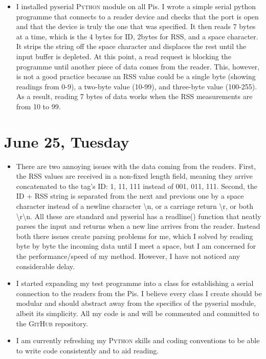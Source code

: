 \documentclass[a4paper,12pt]{article}
\begin{document}
\begin{itemize}
	\item I installed \textsf{pyserial} \textsc{Python} module on all Pis. I wrote a simple serial python programme that connects to a reader device and checks that the port is open and that the device is truly the one that was specified. It then reads 7 bytes at a time, which is the 4 bytes for ID, 2bytes for RSS, and a space character. It strips the string off the space character and displaces the rest until the input buffer is depleted. At this point, a read request is blocking the programme until another piece of data comes from the reader. This, however, is not a good practice because an RSS value could be a single byte (showing readings from 0-9), a two-byte value (10-99), and three-byte value (100-255). As a result, reading 7 bytes of data works when the RSS measurements are from 10 to 99.
\end{itemize}

\section{June 25, Tuesday}

\begin{itemize}
	\item There are two annoying issues with the data coming from the readers. First, the RSS values are received in a non-fixed length field, meaning they arrive concatenated to the tag's ID: 1, 11, 111 instead of 001, 011, 111. Second, the ID + RSS string is separated from the next and previous one by a space character instead of a newline character \textbackslash{}n, or a carriage return \textbackslash{}r, or both \textbackslash{}r\textbackslash{}n. All these are standard and \textsf{pyserial} has a \textsf{readline()} function that neatly parses the input and returns when a new line arrives from the reader. Instead both there issues create parsing problems for me, which I solved by reading byte by byte the incoming data until I meet a space, but I am concerned for the performance/speed of my method. However, I have not noticed any considerable delay.
	\item I started expanding my test programme into a class for establishing a serial connection to the readers from the Pis. I believe every class I create should be modular and should abstract away from the specifics of the \textsf{pyserial} module, albeit its simplicity. All my code is and will be commented and committed to the \textsc{GitHub} repository.
	\item I am currently refreshing my \textsc{Python} skills and coding conventions to be able to write code consistently  and to aid reading.
\end{itemize}

\newpage


\end{document}
